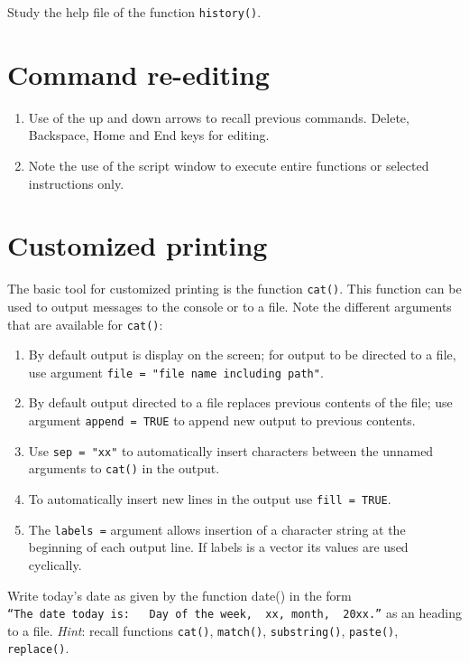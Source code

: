 \documentclass[
]{book}
\begin{document}
Study the help file of the function \texttt{history()}.

\section{Command re-editing}\label{command-re-editing}

\begin{enumerate}
\def\labelenumi{(\alph{enumi})}
\item
  Use of the up and down arrows to recall previous commands. Delete, Backspace, Home and End keys for editing.
\item
  Note the use of the script window to execute entire functions or selected instructions only.
\end{enumerate}

\section{Customized printing}\label{customized-printing}

The basic tool for customized printing is the function \texttt{cat()}. This function can be used to output messages to the console or to a file. Note the different arguments that are available for \texttt{cat()}:

\begin{enumerate}
\def\labelenumi{(\roman{enumi})}
\item
  By default output is display on the screen; for output to be directed to a file, use argument \texttt{file\ =\ "file\ name\ including\ path"}.
\item
  By default output directed to a file replaces previous contents of the file; use argument \texttt{append\ =\ TRUE} to append new output to previous contents.
\item
  Use \texttt{sep\ =\ "xx"} to automatically insert characters between the unnamed arguments to \texttt{cat()} in the output.
\item
  To automatically insert new lines in the output use \texttt{fill\ =\ TRUE}.
\item
  The \texttt{labels\ =} argument allows insertion of a character string at the beginning of each output line. If labels is a vector its values are used cyclically.
\end{enumerate}

Write today's date as given by the function date() in the form \texttt{“The\ date\ today\ is:\ \ \ Day\ of\ the\ week,\ \ xx,\ month,\ \ 20xx.”} as an heading to a file. \emph{Hint}: recall functions \texttt{cat()}, \texttt{match()}, \texttt{substring()}, \texttt{paste()}, \texttt{replace()}.
\end{document}
